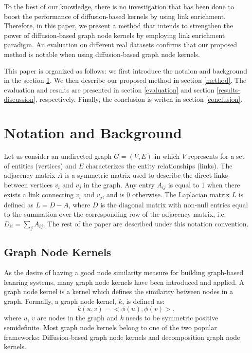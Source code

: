 \documentclass[runningheads,a4paper]{llncs}
\begin{document}
To the best of our knowledge, there is no investigation that has been done to boost the performance of diffusion-based kernels by using link enrichment. Therefore, in this paper, we present a method that intends to strengthen the power of diffusion-based graph node kernels by employing link enrichment paradigm. An evaluation on different real datasets confirms that our proposed method is notable when using diffusion-based graph node kernels.

This paper is organized as follows: we first introduce the notaion and background in the section \ref{background}. We then describe our proposed method in section \ref{method}. The evaluation and results are presented in section \ref{evaluation} and section \ref{results-discussion}, respectively. Finally, the conclusion is writen in section \ref{conclusion}.

\section{Notation and Background}
\label{background}
Let us consider an undirected graph $G = (V, E)$ in which $V$ represents for a set of entities (vertices)  and $E$ characterizes the entity relationships (links). The adjacency matrix $A$ is a symmetric matrix used to describe the direct links between vertices $v_{i}$ and $v_{j}$ in the graph. Any entry $A_{ij}$ is equal to 1 when there exists a link connecting $v_{i}$ and $v_{j}$, and is 0 otherwise. The Laplacian matrix $L$ is defined as $L = D-A$, where $D$ is the diagonal matrix with non-null entries equal to the summation over the corresponding row of the adjacency matrix, i.e. $D_{ii}=\sum_j A_{ij}$. The rest of the paper are described under this notation convention. 
\subsection{Graph Node Kernels}
As the desire of having a good node similarity measure for building graph-based leanring systems, many graph node kernels have been introduced and applied. A graph node kernel is a kernel which defines the similarity between nodes in a graph. Formally, a graph node kernel, $k$, is defined as:
\begin{equation}
  k(u,v) = <\phi(u), \phi(v)>,
\end{equation}
where $u$, $v$ are nodes in the graph and $k$ needs to be symmetric positive semidefinite. Most graph node kernels belong to one of the two popular frameworks: Diffusion-based graph node kernels and decomposition graph node kernels. 
\end{document}
